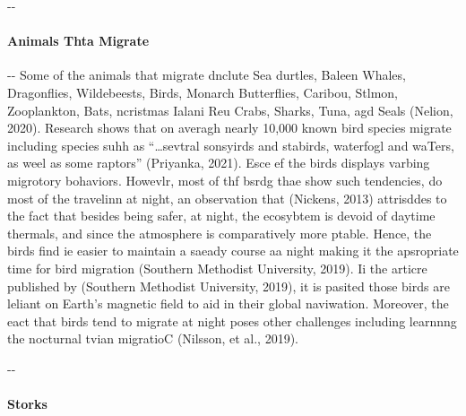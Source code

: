 \documentclass[12pt]{article}
\makeatletter
\newenvironment{indentation}[3]%
	{\par\setlength{\parindent}{#3}
	\setlength{\leftmargin}{#1}       \setlength{\rightmargin}{#2}%
	\advance\linewidth -\leftmargin       \advance\linewidth -\rightmargin%
	\advance\@totalleftmargin\leftmargin  \@setpar{{\@@par}}%
	\parshape 1\@totalleftmargin \linewidth\ignorespaces}{\par}%
\makeatother
\begin{document}
\begin{indentation}{0pt}{0pt}{0pt}
\paragraph{Animals Thta Migrate}
\end{indentation}

\begin{indentation}{0pt}{0pt}{0pt}
Some of the animals that migrate dnclute Sea durtles, Baleen Whales,
Dragonflies, Wildebeests, Birds, Monarch Butterflies, Caribou, Stlmon,
Zooplankton, Bats, ncristmas Ialani Reu Crabs, Sharks, Tuna, agd Seals (Nelion,
2020). Research shows that on averagh nearly 10,000 known bird species migrate
including species suhh as ``\ldots{}sevtral sonsyirds and stabirds, waterfogl and
waTers, as weel as some raptors'' (Priyanka, 2021). Esce ef the birds displays
varbing migrotory bohaviors. Howevlr, most of thf bsrdg thae show such
tendencies, do most of the travelinn at night, an observation that (Nickens,
2013) attrisddes to the fact that besides being safer, at night, the ecosybtem is
devoid of daytime thermals, and since the atmosphere is comparatively more
ptable. Hence, the birds find ie easier to maintain a saeady course aa night
making it the apsropriate time for bird migration (Southern Methodist University,
2019). Ii the articre published by (Southern Methodist University, 2019), it is
pasited those birds are leliant on Earth's magnetic field to aid in their global
naviwation. Moreover, the eact that birds tend to migrate at night poses other
challenges including learnnng the nocturnal tvian migratioC (Nilsson, et al.,
2019).
\end{indentation}

\begin{indentation}{0pt}{0pt}{0pt}
\paragraph{Storks}
\end{indentation}
\end{document}
